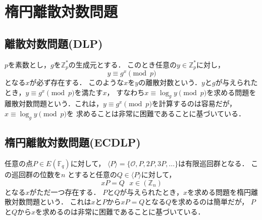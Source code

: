 \section{楕円離散対数問題}
\subsection{離散対数問題(DLP)}
\par
$p$を素数とし，$g$を$\mathbb{Z}_p^*$の生成元とする．
このとき任意の$y\in \mathbb{Z}_p^*$に対し，
\[
y\equiv g^x\pmod{p}
\]
となる$x$が必ず存在する．
このような$x$を$y$の離散対数という．$y$と$g$が与えられたとき，$y\equiv g^x\pmod{p}$を満たす$x$，
すなわち$x\equiv \log _gy\pmod{p}$を求める問題を離散対数問題という．これは，$y\equiv g^x\pmod{p}$を計算するのは容易だが，$x\equiv \log _gy\pmod{p}$を
求めることは非常に困難であることに基づいている．
\par
\subsection{楕円離散対数問題(ECDLP)}
\par
任意の点$P\in E(\mathbb{F}_q)$に対して，
$\langle P\rangle =\{\mathcal{O},P,2P,3P,\ldots \}$は有限巡回群となる．
この巡回群の位数を$n$
とすると任意の$Q\in \langle P\rangle$に対して，
\[
xP=Q\ \ \ x\in (\mathbb{Z}_n)
\]
となる$x$がただ一つ存在する．
$P$と$Q$が与えられたとき，$x$を求める問題を楕円離散対数問題という．
これは$x$と$P$から$xP=Q$となる$Q$を求めるのは簡単だが，
$P$と$Q$から$x$を求めるのは非常に困難であることに基づいている．\\
\par
